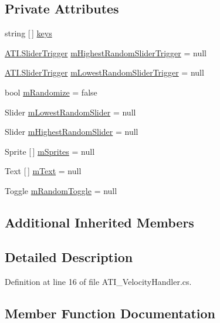 \subsection*{Private Attributes}
\begin{DoxyCompactItemize}
\item 
string \mbox{[}$\,$\mbox{]} \hyperlink{class_a_t_i___velocity_handler_a95a1abb133981ac42dce424f0f94d562}{keys}
\item 
\hyperlink{class_a_t_i_1_1_slider_trigger}{A\+T\+I.\+Slider\+Trigger} \hyperlink{class_a_t_i___velocity_handler_aae4118883cf2e5489ef483f220e48e45}{m\+Highest\+Random\+Slider\+Trigger} = null
\item 
\hyperlink{class_a_t_i_1_1_slider_trigger}{A\+T\+I.\+Slider\+Trigger} \hyperlink{class_a_t_i___velocity_handler_a13d55e2f5670e3f1eb78645a75aa1bce}{m\+Lowest\+Random\+Slider\+Trigger} = null
\item 
bool \hyperlink{class_a_t_i___velocity_handler_aa6f4ac16382d37eb2c66fb358ac87301}{m\+Randomize} = false
\item 
Slider \hyperlink{class_a_t_i___velocity_handler_aba4ceb157ad404a47cedb3583e81d194}{m\+Lowest\+Random\+Slider} = null
\item 
Slider \hyperlink{class_a_t_i___velocity_handler_aec243511d869243292e215a24e87f192}{m\+Highest\+Random\+Slider} = null
\item 
Sprite \mbox{[}$\,$\mbox{]} \hyperlink{class_a_t_i___velocity_handler_a7e2452c41bbcdd313afb2e53fac4a975}{m\+Sprites} = null
\item 
Text \mbox{[}$\,$\mbox{]} \hyperlink{class_a_t_i___velocity_handler_ad8c048670a748ece6b2f8bbf287e7674}{m\+Text} = null
\item 
Toggle \hyperlink{class_a_t_i___velocity_handler_a6ca709a10f8b2eb0f1141c589e7f9742}{m\+Random\+Toggle} = null
\end{DoxyCompactItemize}
\subsection*{Additional Inherited Members}


\subsection{Detailed Description}


Definition at line 16 of file A\+T\+I\+\_\+\+Velocity\+Handler.\+cs.



\subsection{Member Function Documentation}
\mbox{\label{class_a_t_i___velocity_handler_a6e1fd3ceb35873a09e138bebd0c323fd}} 
